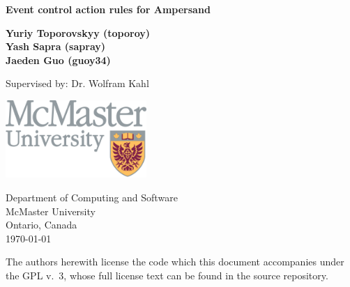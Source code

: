 \begin{titlepage}
    \begin{center}
        \vspace*{1cm}
        
        \textbf{ Event control action rules for Ampersand}
        
             
        \vspace{1.5cm}
        
        \textbf{Yuriy Toporovskyy (toporoy)\\ Yash Sapra (sapray) \\ Jaeden Guo 
    (guoy34)}
        
        \vfill
        
        Supervised by: Dr. Wolfram Kahl
        
        \vspace{0.8cm}
        
        \includegraphics[width=0.4\textwidth]{../figures/mac_logo.jpg}
        
        Department of Computing and Software\\
        McMaster University\\
        Ontario, Canada\\
        \today
 
        \vfill 

        The authors herewith license the code which this document accompanies under the GPL v.~3, 
        whose full license text can be found in the source repository. 

    \end{center}
\end{titlepage}
